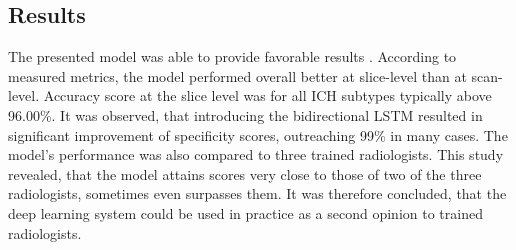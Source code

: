\subsection*{Results}
The presented model was able to provide favorable results \cite{relatedWork3}. According to measured metrics, the model performed overall better at slice-level than at scan-level. Accuracy score at the slice level was for all ICH subtypes typically above 96.00\%. It was observed, that introducing the bidirectional LSTM resulted in significant improvement of specificity scores, outreaching 99\% in many cases. The model's performance was also compared to three trained radiologists. This study revealed, that the model attains scores very close to those of two of the three radiologists, sometimes even surpasses them. It was therefore concluded, that the deep learning system could be used in practice as a second opinion to trained radiologists.
